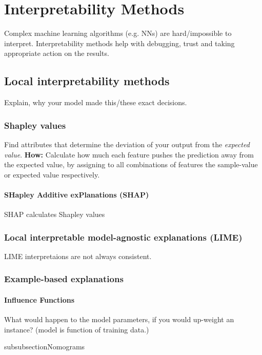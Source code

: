 \documentclass[../main.tex]{subfiles}
\begin{document}
\section{Interpretability Methods}
Complex machine learning algorithms (e.g. NNs) are hard/impossible to interpret. Interpretability methods help with debugging, trust and taking appropriate action on the results.

\subsection{Local interpretability methods}
Explain, why your model made this/these exact decisions. 

    \subsubsection{Shapley values}
    Find attributes that determine the deviation of your output from the \textit{expected value}. \textbf{How:} Calculate how much each feature pushes the prediction away from the expected value, by assigning to all combinations of features the sample-value or expected value respectively. \\
    \paragraph{SHapley Additive exPlanations (SHAP)}
    SHAP calculates Shapley values %

    \subsubsection{Local interpretable model-agnostic explanations (LIME)}
    \attention LIME interpretaions are not always consistent. %

    \subsubsection{Example-based explanations}
    \paragraph{Influence Functions}
    What would happen to the model parameters, if you would up-weight an instance? (model is function of training data.)

    subsubsection{Nomograms}
\end{document}
